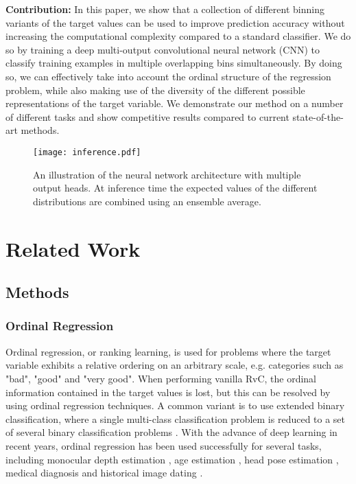 \documentclass[10pt, conference, a4paper]{IEEEtran}
\begin{document}
\textbf{Contribution:} In this paper, we show that a collection of different binning variants of the target values can be used to improve prediction accuracy without increasing the computational complexity compared to a standard classifier. We do so by training a deep multi-output convolutional neural network (CNN) to classify training examples in multiple overlapping bins simultaneously. By doing so, we can effectively take into account the ordinal structure of the regression problem, while also making use of the diversity of the different possible representations of the target variable. We demonstrate our method on a number of different tasks and show competitive results compared to current state-of-the-art methods. 

\begin{figure}[t]
  \centering
  \texttt{[image: inference.pdf]}
  \caption{An illustration of the neural network architecture with multiple output heads. At inference time the expected values of the different distributions are combined using an ensemble average.}
\label{inference}
\end{figure}

\section{Related Work}

\subsection{Methods}

\subsubsection{Ordinal Regression}
Ordinal regression, or ranking learning, is used for problems where the target variable exhibits a relative ordering on an arbitrary scale, e.g. categories such as "bad", "good" and "very good". When performing vanilla RvC, the ordinal information contained in the target values is lost, but this can be resolved by using ordinal regression techniques. A common variant is to use extended binary classification, where a single multi-class classification problem is reduced to a set of several binary classification problems \cite{li2007ordinal}. With the advance of deep learning in recent years, ordinal regression has been used successfully for several tasks, including monocular depth estimation \cite{fu2018deep}, age estimation \cite{niu2016ordinal}, head pose estimation \cite{hsu2018quatnet}, medical diagnosis \cite{liu2018ordinal} and historical image dating \cite{liu2017deep}.
\end{document}
